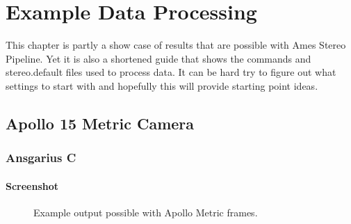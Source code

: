 \chapter{Example Data Processing}

This chapter is partly a show case of results that are possible with
Ames Stereo Pipeline. Yet it is also a shortened guide that shows the
commands and stereo.default files used to process data. It can be hard
try to figure out what settings to start with and hopefully this will
provide starting point ideas.

\section{Apollo 15 Metric Camera}

\subsection{Ansgarius C}

\subsubsection*{Screenshot}

\begin{figure}[hb]
\centering
  \hfil
\caption{Example output possible with Apollo Metric frames.}
\label{fig:metric_example}
\end{figure}

